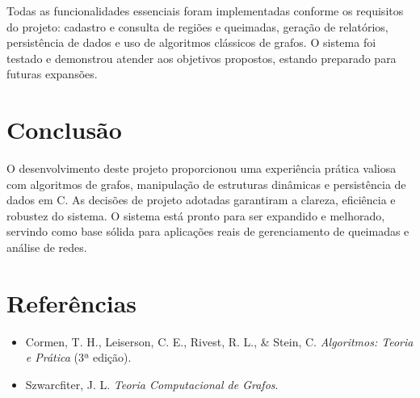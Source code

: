 \documentclass{article}
\begin{document}
Todas as funcionalidades essenciais foram implementadas conforme os requisitos do projeto: cadastro e consulta de regiões e queimadas, geração de relatórios, persistência de dados e uso de algoritmos clássicos de grafos. O sistema foi testado e demonstrou atender aos objetivos propostos, estando preparado para futuras expansões.

\section{Conclusão}

O desenvolvimento deste projeto proporcionou uma experiência prática valiosa com algoritmos de grafos, manipulação de estruturas dinâmicas e persistência de dados em C. As decisões de projeto adotadas garantiram a clareza, eficiência e robustez do sistema. O sistema está pronto para ser expandido e melhorado, servindo como base sólida para aplicações reais de gerenciamento de queimadas e análise de redes.

\section{Referências}

\begin{itemize}
    \item Cormen, T. H., Leiserson, C. E., Rivest, R. L., \& Stein, C. \textit{Algoritmos: Teoria e Prática} (3ª edição).
    \item Szwarcfiter, J. L. \textit{Teoria Computacional de Grafos}.
\end{itemize}
\end{document}
